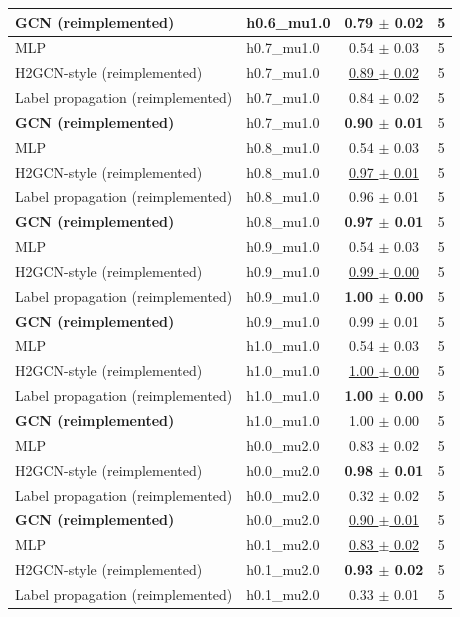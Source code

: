 \begin{tabular}{llcc}
\textbf{GCN (reimplemented)} & h0.6\_mu1.0 & \textbf{0.79 $\pm$ 0.02} & 5 \\
\midrule
MLP & h0.7\_mu1.0 & 0.54 $\pm$ 0.03 & 5 \\
H2GCN-style (reimplemented) & h0.7\_mu1.0 & \underline{0.89 $\pm$ 0.02} & 5 \\
Label propagation (reimplemented) & h0.7\_mu1.0 & 0.84 $\pm$ 0.02 & 5 \\
\textbf{GCN (reimplemented)} & h0.7\_mu1.0 & \textbf{0.90 $\pm$ 0.01} & 5 \\
\midrule
MLP & h0.8\_mu1.0 & 0.54 $\pm$ 0.03 & 5 \\
H2GCN-style (reimplemented) & h0.8\_mu1.0 & \underline{0.97 $\pm$ 0.01} & 5 \\
Label propagation (reimplemented) & h0.8\_mu1.0 & 0.96 $\pm$ 0.01 & 5 \\
\textbf{GCN (reimplemented)} & h0.8\_mu1.0 & \textbf{0.97 $\pm$ 0.01} & 5 \\
\midrule
MLP & h0.9\_mu1.0 & 0.54 $\pm$ 0.03 & 5 \\
H2GCN-style (reimplemented) & h0.9\_mu1.0 & \underline{0.99 $\pm$ 0.00} & 5 \\
Label propagation (reimplemented) & h0.9\_mu1.0 & \textbf{1.00 $\pm$ 0.00} & 5 \\
\textbf{GCN (reimplemented)} & h0.9\_mu1.0 & 0.99 $\pm$ 0.01 & 5 \\
\midrule
MLP & h1.0\_mu1.0 & 0.54 $\pm$ 0.03 & 5 \\
H2GCN-style (reimplemented) & h1.0\_mu1.0 & \underline{1.00 $\pm$ 0.00} & 5 \\
Label propagation (reimplemented) & h1.0\_mu1.0 & \textbf{1.00 $\pm$ 0.00} & 5 \\
\textbf{GCN (reimplemented)} & h1.0\_mu1.0 & 1.00 $\pm$ 0.00 & 5 \\
\midrule
MLP & h0.0\_mu2.0 & 0.83 $\pm$ 0.02 & 5 \\
H2GCN-style (reimplemented) & h0.0\_mu2.0 & \textbf{0.98 $\pm$ 0.01} & 5 \\
Label propagation (reimplemented) & h0.0\_mu2.0 & 0.32 $\pm$ 0.02 & 5 \\
\textbf{GCN (reimplemented)} & h0.0\_mu2.0 & \underline{0.90 $\pm$ 0.01} & 5 \\
\midrule
MLP & h0.1\_mu2.0 & \underline{0.83 $\pm$ 0.02} & 5 \\
H2GCN-style (reimplemented) & h0.1\_mu2.0 & \textbf{0.93 $\pm$ 0.02} & 5 \\
Label propagation (reimplemented) & h0.1\_mu2.0 & 0.33 $\pm$ 0.01 & 5 \\

\end{tabular}
